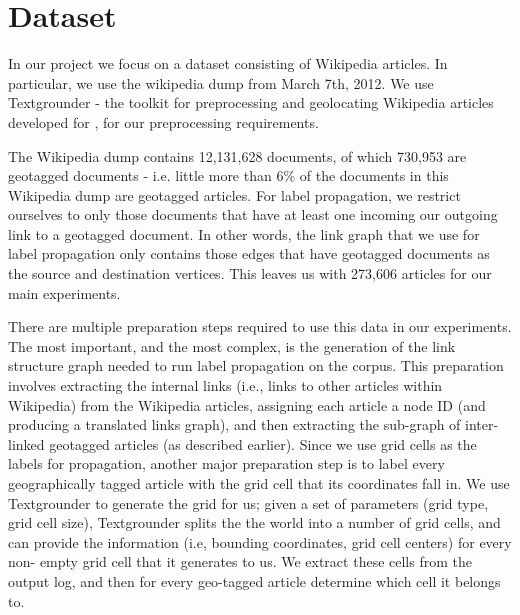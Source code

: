 
\section{Dataset} 
\par In our project we focus on a dataset consisting of
Wikipedia articles. In particular, we use the wikipedia dump from March
7th, 2012. We use Textgrounder - the toolkit for preprocessing and geolocating
Wikipedia articles developed for , for our
preprocessing requirements.

\par The Wikipedia dump contains 12,131,628 documents,  of which 730,953 are geotagged documents -
i.e. little more than 6\% of the documents in this Wikipedia dump are
geotagged articles.  For label propagation, we restrict ourselves to only
those documents that have at least one incoming our outgoing link to a
geotagged document. In other words, the link graph that we use for label
propagation only contains those edges that have geotagged documents as the
source and destination vertices. This leaves us with 273,606 articles for our
main experiments.

\par There are multiple preparation steps required to use this data in our
experiments. The most important, and the most complex, is the generation of
the  link structure graph needed to run label propagation on the corpus. This
preparation involves extracting the internal links (i.e., links to other
articles within Wikipedia)  from the Wikipedia articles, assigning each
article a node ID (and producing a translated links  graph), and then
extracting the sub-graph of inter-linked geotagged articles (as  described
earlier). Since we use grid cells as the labels for propagation,  another
major preparation step is to label every geographically tagged article  with
the grid cell that its coordinates fall in. We use Textgrounder to generate the
grid for us;  given a set of parameters (grid type, grid cell size),
Textgrounder splits the the world into a number of grid cells, and can provide
the information (i.e, bounding coordinates, grid cell centers) for every  non-
empty grid cell that it generates to us. We extract these cells from the
output  log, and then for every geo-tagged article determine which cell it
belongs to.

